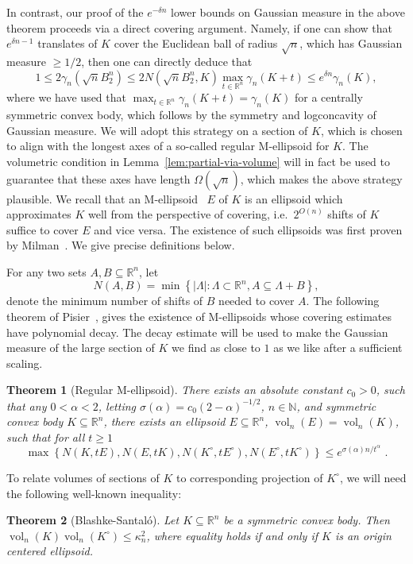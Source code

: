 \documentclass[12pt]{article}
\newtheorem{theorem}{Theorem}
\newcommand{\R}{{\mathbb{R}}}
\newcommand{\N}{{\mathbb{N}}}
\newcommand{\set}[1]{\left\{ #1 \right\}}
\DeclareMathOperator{\vol}{vol}
\begin{document}
In contrast, our proof of the $e^{-\delta n}$ lower bounds on Gaussian measure
in the above theorem proceeds via a direct covering argument. Namely, if one can
show that $e^{\delta n-1}$ translates of $K$ cover the Euclidean ball of radius
$\sqrt{n}$, which has Gaussian measure $\geq 1/2$, then one can directly deduce
that 
\[
1 \leq 2\gamma_n(\sqrt{n}B_2^n) \leq 2N(\sqrt{n} B_2^n,K) \max_{t \in \R^n}
\gamma_n(K+t) \leq e^{\delta n} \gamma_n(K) ,
\]
where we have used that $\max_{t \in \R^n} \gamma_n(K+t) = \gamma_n(K)$ for a
centrally symmetric convex body, which follows by the symmetry and logconcavity
of Gaussian measure. We will adopt this strategy on a section of $K$, which is
chosen to align with the longest axes of a so-called regular M-ellipsoid for
$K$. The volumetric condition in Lemma~\ref{lem:partial-via-volume} will in fact
be used to guarantee that these axes have length $\Omega(\sqrt{n})$, which makes
the above strategy plausible. We recall that an M-ellipsoid~ $E$ of $K$ is an
ellipsoid which approximates $K$ well from the perspective of covering,
i.e.~$2^{O(n)}$ shifts of $K$ suffice to cover $E$ and vice versa. The existence
of such ellipsoids was first proven by Milman~\cite{Milman86-reverseBM}. We give
precise definitions below. 

For any two sets $A,B \subseteq \R^n$, let 
\[
N(A,B) = \min \set{|\Lambda|: \Lambda \subset \R^n, A \subseteq \Lambda+B} ,
\]
denote the minimum number of shifts of $B$ needed to cover $A$. The following
theorem of Pisier~\cite{Pisier-book}, gives the existence of M-ellipsoids whose
covering estimates have polynomial decay. The decay estimate will be used to
make the Gaussian measure of the large section of $K$ we find as close to $1$ as
we like after a sufficient scaling. 

\begin{theorem}[Regular M-ellipsoid]
There exists an absolute constant $c_0 > 0$, such that any $0 < \alpha < 2$,
letting $\sigma(\alpha) = c_0(2-\alpha)^{-1/2}$, $n \in \N$, and symmetric
convex body $K \subseteq \R^n$, there exists an ellipsoid $E \subseteq \R^n$,
$\vol_n(E)=\vol_n(K)$, such that for all $t \geq 1$
\[
\max \set{N(K,tE),N(E,tK),N(K^\circ,tE^\circ),N(E^\circ,tK^\circ)} \leq
e^{\sigma(\alpha) n / t^\alpha} \text{ .}
\]
\end{theorem}

To relate volumes of sections of $K$ to corresponding projection of $K^\circ$,
we will need the following well-known inequality:

\begin{theorem}[Blashke-Santal{\'o}]\label{thm:santalo} 
Let $K \subseteq \R^n$ be a symmetric convex body. Then $\vol_n(K)
\vol_n(K^\circ) \leq \kappa_n^2$, where equality holds if and only if $K$ is
an origin centered ellipsoid. 
\end{theorem}
\end{document}
